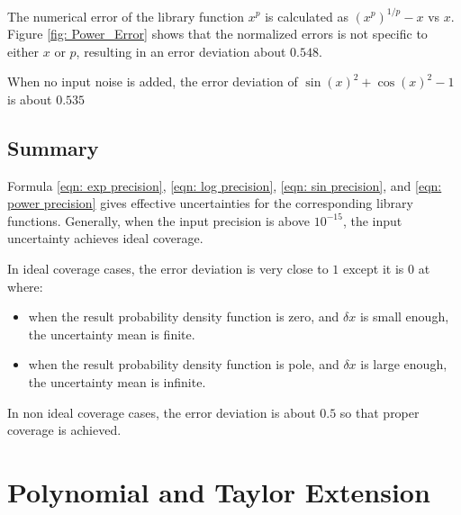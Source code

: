 \documentclass[twoside]{article}
\numberwithin{equation}{section}
\begin{document}
The numerical error of the library function $x^p$ is calculated as $(x^p)^{1/p} - x$ vs $x$.
Figure \ref{fig: Power_Error} shows that the normalized errors is not specific to either $x$ or $p$, resulting in an error deviation about $0.548$.

When no input noise is added, the error deviation of $\sin(x)^2 + \cos(x)^2 - 1$ is about $0.535$


\subsection{Summary}

Formula \eqref{eqn: exp precision}, \eqref{eqn: log precision}, \eqref{eqn: sin precision}, and \eqref{eqn: power precision} gives effective uncertainties for the corresponding library functions.
Generally, when the input precision is above $10^{-15}$, the input uncertainty achieves ideal coverage.

In ideal coverage cases, the error deviation is very close to $1$ except it is $0$ at where:
\begin{itemize}
\item when the result probability density function is zero, and $\delta x$ is small enough, the uncertainty mean is finite.

\item when the result probability density function is pole, and $\delta x$ is large enough, the uncertainty mean is infinite.
\end{itemize}
In non ideal coverage cases, the error deviation is about $0.5$ so that proper coverage is achieved.



\clearpage
\section{Polynomial and Taylor Extension}
\label{sec: polynomial}

\iffalse
\end{document}
